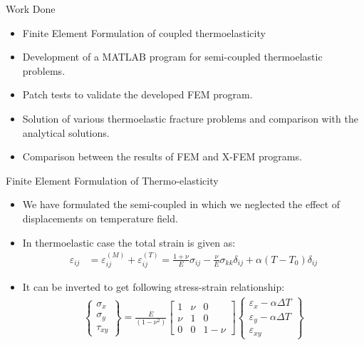 \documentclass{beamer}
\begin{document}
\begin{frame}[t,fragile]{Work Done}
    \begin{itemize}
        \item Finite Element Formulation of coupled thermoelasticity 
        \item Development of a MATLAB program for semi-coupled thermoelastic problems.
        \item Patch tests to validate the developed FEM program.
        \item Solution of various thermoelastic fracture problems and comparison with the analytical solutions. 
        \item Comparison between the results of FEM and X-FEM programs. 
    \end{itemize}
\end{frame}
\begin{frame}[t,fragile]{Finite Element Formulation of Thermo-elasticity}
\begin{itemize}
\item We have formulated the semi-coupled in which we neglected the effect of displacements on temperature field.
\item In thermoelastic case the total strain is given as: 
\begin{align*}
    \varepsilon_{ij}&=\varepsilon_{ij}^{(M)}+\varepsilon_{ij}^{(T)}
    =\frac{1+\nu}{E}\sigma_{ij}-\frac{\nu}{E}\sigma_{kk}\delta_{ij}+\alpha(T-T_0)\delta_{ij}\nonumber
\end{align*}

\item It can be inverted to get following stress-strain relationship:
    \footnotesize
\begin{align*}
    \begin{Bmatrix}
        \sigma_{x}\\ \sigma_{y}\\ \tau_{xy} 
    \end{Bmatrix} =\frac{E}{(1-\nu^2)}
    \begin{bmatrix}
        1 & \nu & 0 \\ \nu & 1 & 0 \\ 0 & 0 & 1-\nu 
    \end{bmatrix}
    \begin{Bmatrix}
        \varepsilon_{x}-\alpha\Delta T \\ \varepsilon_{y}-\alpha \Delta T \\ \varepsilon_{xy} 
    \end{Bmatrix}
\end{align*}
\end{itemize}

\end{frame}
\end{document}
